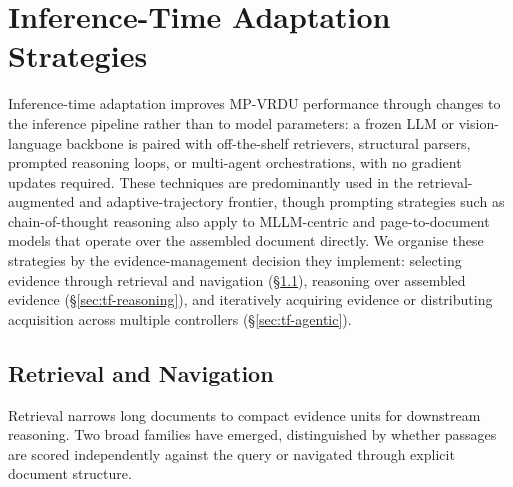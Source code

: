\section{Inference-Time Adaptation Strategies}
\label{sec:inference-time}
Inference-time adaptation improves MP-VRDU performance through changes to the inference pipeline rather than to model parameters: a frozen LLM or vision-language backbone is paired with off-the-shelf retrievers, structural parsers, prompted reasoning loops, or multi-agent orchestrations, with no gradient updates required. These techniques are predominantly used in the retrieval-augmented and adaptive-trajectory frontier, though prompting strategies such as chain-of-thought reasoning also apply to MLLM-centric and page-to-document models that operate over the assembled document directly. We organise these strategies by the evidence-management decision they implement: selecting evidence through retrieval and navigation (\S\ref{sec:tf-retrieval}), reasoning over assembled evidence (\S\ref{sec:tf-reasoning}), and iteratively acquiring evidence or distributing acquisition across multiple controllers (\S\ref{sec:tf-agentic}).

\subsection{Retrieval and Navigation}
\label{sec:tf-retrieval}

Retrieval narrows long documents to compact evidence units for downstream reasoning. Two broad families have emerged, distinguished by whether passages are scored independently against the query or navigated through explicit document structure.

